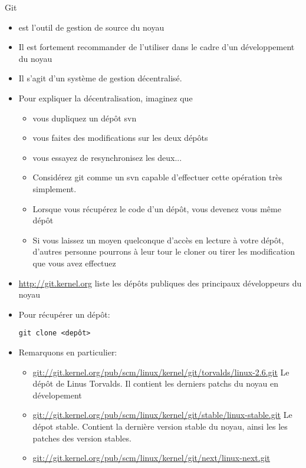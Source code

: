 \begin{frame}[fragile=singleslide]{Git}
    \begin{itemize} 
    \item {} est l'outil de gestion de source du noyau
    \item  Il est fortement  recommander de  l'utiliser dans  le cadre
      d'un développement du noyau
    \item Il s'agit d'un système de gestion décentralisé. 
    \item Pour expliquer la décentralisation, imaginez que
      \begin{itemize} 
      \item vous dupliquez un dépôt svn
      \item vous faites des modifications sur les deux dépôts
      \item vous essayez de resynchronisez les deux...
      \item  Considérez git  comme  un svn  capable d'effectuer  cette
        opération très simplement.
      \item Lorsque  vous récupérez le  code d'un dépôt,  vous devenez
        vous même dépôt
      \item Si vous  laissez un moyen quelconque d'accès  en lecture à
        votre dépôt, d'autres personne  pourrons à leur tour le cloner
        ou tirer les modification que vous avez effectuez
      \end{itemize} 
    \item \url{http://git.kernel.org}  liste les dépôts  publiques des
      principaux développeurs du noyau
    \item Pour récupérer un dépôt:
      \begin{lstlisting} 
git clone <depôt>
      \end{lstlisting} 
    \item Remarquons en particulier:
      \begin{itemize} 
      \item
        \url{git://git.kernel.org/pub/scm/linux/kernel/git/torvalds/linux-2.6.git}
        Le dépôt de Linus Torvalds. Il contient les derniers patchs du
        noyau en dévelopement
      \item
        \url{git://git.kernel.org/pub/scm/linux/kernel/git/stable/linux-stable.git}
        Le dépot stable. Contient la dernière version stable du noyau,
        ainsi les les patches des version stables.
      \item
        \url{git://git.kernel.org/pub/scm/linux/kernel/git/next/linux-next.git}

\end{itemize}
\end{itemize}
\end{frame}
